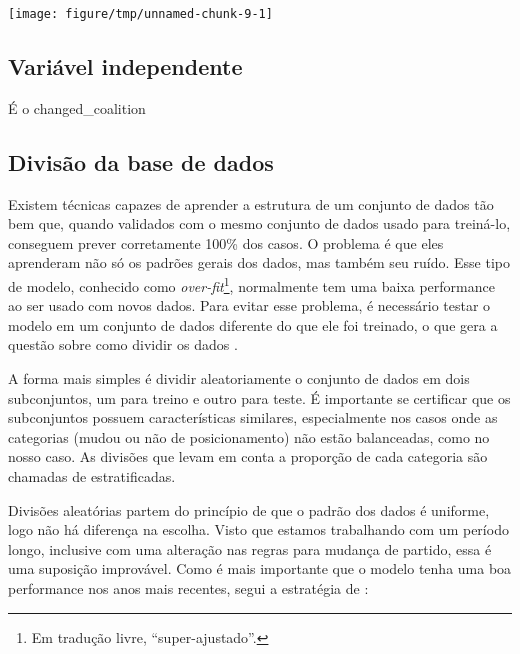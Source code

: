 \documentclass[a4paper,titlepage]{ppgi}\usepackage[]{graphicx}\usepackage[]{color}
\newenvironment{knitrout}{}{} %
\begin{document}
\begin{knitrout}
\color{fgcolor}
\texttt{[image: figure/tmp/unnamed-chunk-9-1]} 

\end{knitrout}

\subsection{Variável independente}

É o changed\_coalition

\subsection{Divisão da base de dados}






Existem técnicas capazes de aprender a estrutura de um conjunto de dados tão
bem que, quando validados com o mesmo conjunto de dados usado para treiná-lo,
conseguem prever corretamente 100\% dos casos. O problema é que eles aprenderam
não só os padrões gerais dos dados, mas também seu ruído. Esse tipo de modelo,
conhecido como \emph{over-fit}\footnote{Em tradução livre,
``super-ajustado''.}, normalmente tem uma baixa performance ao ser usado com
novos dados. Para evitar esse problema, é necessário testar o modelo em um
conjunto de dados diferente do que ele foi treinado, o que gera a questão sobre
como dividir os dados \cite{Kuhn2013}.

A forma mais simples é dividir aleatoriamente o conjunto de dados em dois
subconjuntos, um para treino e outro para teste. É importante se certificar que
os subconjuntos possuem características similares, especialmente nos casos onde
as categorias (mudou ou não de posicionamento) não estão balanceadas, como no
nosso caso. As divisões que levam em conta a proporção de cada categoria são
chamadas de estratificadas.

Divisões aleatórias partem do princípio de que o padrão dos dados é uniforme,
logo não há diferença na escolha. Visto que estamos trabalhando com um período
longo, inclusive com uma alteração nas regras para mudança de partido, essa é
uma suposição improvável. Como é mais importante que o modelo tenha uma boa
performance nos anos mais recentes, segui a estratégia de
:
\end{document}
